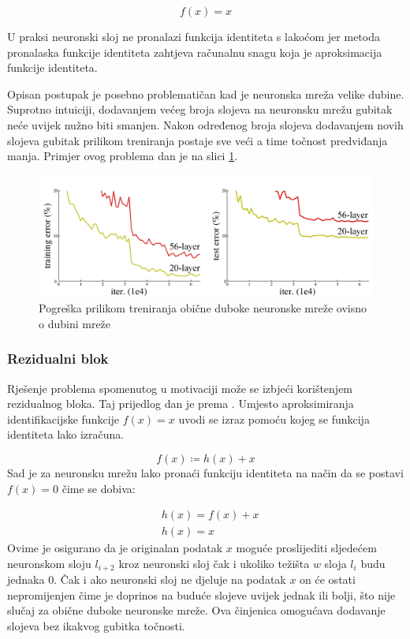 \documentclass[times, utf8, zavrsni,numeric,pstricks]{fer}
\begin{document}
\begin{equation}\label{eq:identitiy_function}
f(x) = x
\end{equation}

U praksi neuronski sloj ne pronalazi funkcija identiteta s lakoćom jer metoda pronalaska funkcije identiteta zahtjeva računalnu snagu koja je aproksimacija funkcije identiteta.

Opisan postupak je posebno problematičan kad je neuronska mreža velike dubine. Suprotno intuiciji, dodavanjem većeg broja slojeva na neuronsku mrežu gubitak neće uvijek nužno biti smanjen. Nakon određenog broja slojeva dodavanjem novih slojeva gubitak prilikom treniranja postaje sve veći a time točnost predviđanja manja. Primjer ovog problema dan je na slici \ref{fig:deep_plain_error}.

\begin{figure}[H]
	\centering
	\includegraphics[width=\linewidth, height=0.3\paperheight, keepaspectratio]{deep_plain_error.jpeg}
	\caption{Pogreška prilikom treniranja obične duboke neuronske mreže ovisno o dubini mreže \cite{residual}}	
	\label{fig:deep_plain_error}
\end{figure}

\subsubsection{Rezidualni blok}

Rješenje problema spomenutog u motivaciji može se izbjeći korištenjem rezidualnog bloka. Taj prijedlog dan je prema  \cite{residual}. Umjesto aproksimiranja identifikacijske funkcije $f(x) = x$ uvodi se izraz pomoću kojeg se funkcija identiteta lako izračuna. 

\begin{equation}\label{eq:residual_identity}
f(x) \coloneqq h(x) + x
\end{equation}
\noindent
Sad je za neuronsku mrežu lako pronaći funkciju identiteta na način da se postavi $f(x) = 0$ čime se dobiva:

\begin{align*}
	& h(x) = f(x) + x \\
	& h(x) = x 
\end{align*}
\noindent
Ovime je osigurano da je originalan podatak $x$ moguće proslijediti sljedećem neuronskom sloju $l_{i+2}$ kroz neuronski sloj čak i ukoliko težišta $w$ sloja $l_i$ budu jednaka $0$. Čak i ako neuronski sloj ne djeluje na podatak $x$ on će ostati nepromijenjen čime je doprinos na buduće slojeve uvijek jednak ili bolji, što nije slučaj za obične duboke neuronske mreže. Ova činjenica omogućava dodavanje slojeva bez ikakvog gubitka točnosti. 
\end{document}

